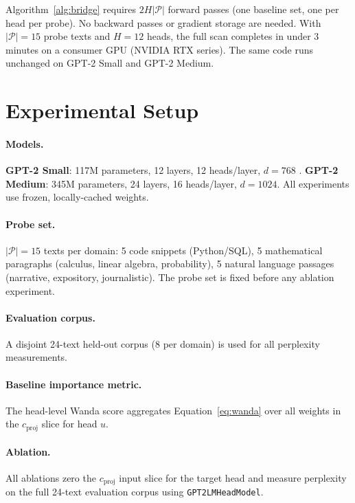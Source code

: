 \documentclass[11pt,a4paper]{article}
\theoremstyle{definition}
\theoremstyle{plain}
\begin{document}
Algorithm~\ref{alg:bridge} requires $2H|\mathcal{P}|$ forward passes (one
baseline set, one per head per probe).
No backward passes or gradient storage are needed.
With $|\mathcal{P}|=15$ probe texts and $H=12$ heads, the full scan
completes in under 3 minutes on a consumer GPU (NVIDIA RTX series).
The same code runs unchanged on GPT-2 Small and GPT-2 Medium.

\section{Experimental Setup}
\label{sec:setup}

\paragraph{Models.}
\textbf{GPT-2 Small}: 117M parameters, 12 layers, 12 heads/layer,
$d=768$ \citep{radford2019gpt2}.
\textbf{GPT-2 Medium}: 345M parameters, 24 layers, 16 heads/layer,
$d=1024$.
All experiments use frozen, locally-cached weights.

\paragraph{Probe set.}
$|\mathcal{P}|=15$ texts per domain: 5 code snippets (Python/SQL),
5 mathematical paragraphs (calculus, linear algebra, probability), 5
natural language passages (narrative, expository, journalistic).
The probe set is fixed before any ablation experiment.

\paragraph{Evaluation corpus.}
A disjoint 24-text held-out corpus (8 per domain) is used for all
perplexity measurements.

\paragraph{Baseline importance metric.}
The head-level Wanda score aggregates Equation~\eqref{eq:wanda} over all
weights in the $c_{\text{proj}}$ slice for head $u$.

\paragraph{Ablation.}
All ablations zero the $c_{\text{proj}}$ input slice for the target head
and measure perplexity on the full 24-text evaluation corpus using
\texttt{GPT2LMHeadModel}.
\end{document}
